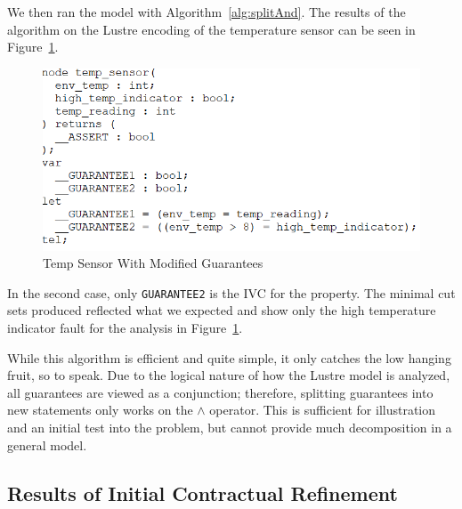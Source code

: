 We then ran the model with Algorithm~\ref{alg:splitAnd}. The results of the algorithm on the Lustre encoding of the temperature sensor can be seen in Figure~\ref{fig:lustreTwoGuar}. 

\begin{figure}[h!]
\begin{center}
\includegraphics[width=.8\textwidth]{images/lustreOneGuar.PNG}
\caption{Temp Sensor With Modified Guarantees} \label{fig:lustreTwoGuar}
\end{center}
\end{figure} 

 In the second case, only \texttt{GUARANTEE2} is the IVC for the property. The minimal cut sets produced reflected what we expected and show only the high temperature indicator fault for the analysis in Figure~\ref{fig:lustreTwoGuar}. 

While this algorithm is efficient and quite simple, it only catches the low hanging fruit, so to speak. Due to the logical nature of how the Lustre model is analyzed, all guarantees are viewed as a conjunction; therefore, splitting guarantees into new statements only works on the $\land$ operator. This is sufficient for illustration and an initial test into the problem, but cannot provide much decomposition in a general model. 

\subsection{Results of Initial Contractual Refinement}
\label{sec:resultsAND}
